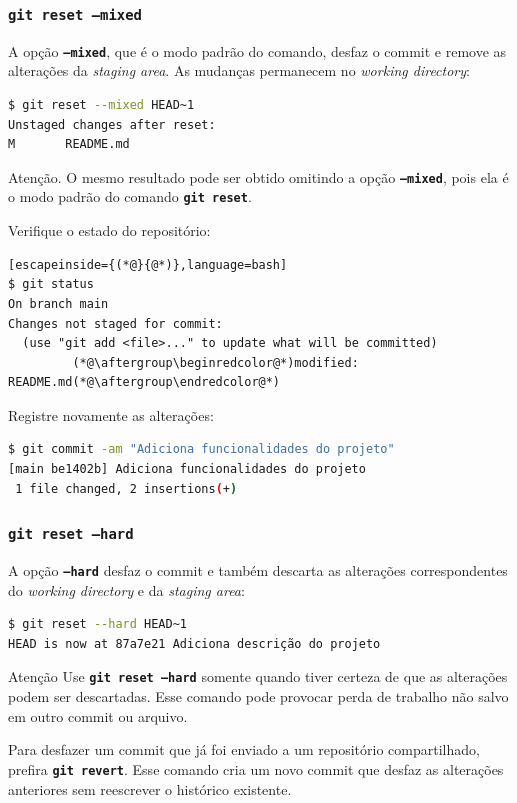 \documentclass[12pt,a4paper]{article}
\begin{document}
\subsubsection{\texttt{git reset --mixed}}

A opção \textbf{\texttt{--mixed}}, que é o modo padrão do comando, desfaz o commit e remove as alterações da \textit{staging area}. As mudanças permanecem no \textit{working directory}:

\begin{lstlisting}[language=bash]
$ git reset --mixed HEAD~1
Unstaged changes after reset:
M       README.md
\end{lstlisting}

\begin{question}{Atenção.}
\footnotesize O mesmo resultado pode ser obtido omitindo a opção \textbf{\texttt{--mixed}}, pois ela é o modo padrão do comando \textbf{\texttt{git reset}}.
\end{question}

Verifique o estado do repositório:

\begin{lstlisting}[escapeinside={(*@}{@*)},language=bash]
$ git status
On branch main
Changes not staged for commit:
  (use "git add <file>..." to update what will be committed)
         (*@\aftergroup\beginredcolor@*)modified:   README.md(*@\aftergroup\endredcolor@*)
\end{lstlisting}

Registre novamente as alterações:

\begin{lstlisting}[language=bash]
$ git commit -am "Adiciona funcionalidades do projeto"
[main be1402b] Adiciona funcionalidades do projeto
 1 file changed, 2 insertions(+)
\end{lstlisting}

\subsubsection{\texttt{git reset --hard}}

A opção \textbf{\texttt{--hard}} desfaz o commit e também descarta as alterações correspondentes do \textit{working directory} e da \textit{staging area}:

\begin{lstlisting}[language=bash]
$ git reset --hard HEAD~1
HEAD is now at 87a7e21 Adiciona descrição do projeto
\end{lstlisting}

\begin{question}{Atenção}
\footnotesize Use \textbf{\texttt{git reset --hard}} somente quando tiver certeza de que as alterações podem ser descartadas. Esse comando pode provocar perda de trabalho não salvo em outro commit ou arquivo.

Para desfazer um commit que já foi enviado a um repositório compartilhado, prefira \textbf{\texttt{git revert}}. Esse comando cria um novo commit que desfaz as alterações anteriores sem reescrever o histórico existente.
\end{question}
\end{document}
